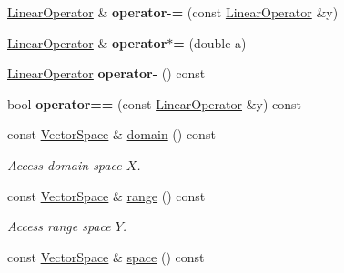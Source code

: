 \begin{DoxyCompactItemize}
\item 
\hypertarget{classSpacy_1_1LinearOperator_a38f6913a360e69a37f32487044958262}{\hyperlink{classSpacy_1_1LinearOperator}{\-Linear\-Operator} \& {\bfseries operator-\/=} (const \hyperlink{classSpacy_1_1LinearOperator}{\-Linear\-Operator} \&y)}\label{classSpacy_1_1LinearOperator_a38f6913a360e69a37f32487044958262}

\item 
\hypertarget{classSpacy_1_1LinearOperator_a1a337571a68b1c5ece14c637682ac8a4}{\hyperlink{classSpacy_1_1LinearOperator}{\-Linear\-Operator} \& {\bfseries operator$\ast$=} (double a)}\label{classSpacy_1_1LinearOperator_a1a337571a68b1c5ece14c637682ac8a4}

\item 
\hypertarget{classSpacy_1_1LinearOperator_ac77bf18c27c54f2589cfd8ccd6e44dd9}{\hyperlink{classSpacy_1_1LinearOperator}{\-Linear\-Operator} {\bfseries operator-\/} () const }\label{classSpacy_1_1LinearOperator_ac77bf18c27c54f2589cfd8ccd6e44dd9}

\item 
\hypertarget{classSpacy_1_1LinearOperator_afbb3e1bce81ac646081f46fc3688313b}{bool {\bfseries operator==} (const \hyperlink{classSpacy_1_1LinearOperator}{\-Linear\-Operator} \&y) const }\label{classSpacy_1_1LinearOperator_afbb3e1bce81ac646081f46fc3688313b}

\item 
\hypertarget{classSpacy_1_1LinearOperator_a1acd2a2f71a95baa2c364b88c4eee126}{const \hyperlink{classSpacy_1_1VectorSpace}{\-Vector\-Space} \& \hyperlink{classSpacy_1_1LinearOperator_a1acd2a2f71a95baa2c364b88c4eee126}{domain} () const }\label{classSpacy_1_1LinearOperator_a1acd2a2f71a95baa2c364b88c4eee126}

\begin{DoxyCompactList}\small\item\em \-Access domain space $X$. \end{DoxyCompactList}\item 
\hypertarget{classSpacy_1_1LinearOperator_a29653883e8ebc3460e9294e3bceee5bf}{const \hyperlink{classSpacy_1_1VectorSpace}{\-Vector\-Space} \& \hyperlink{classSpacy_1_1LinearOperator_a29653883e8ebc3460e9294e3bceee5bf}{range} () const }\label{classSpacy_1_1LinearOperator_a29653883e8ebc3460e9294e3bceee5bf}

\begin{DoxyCompactList}\small\item\em \-Access range space $Y$. \end{DoxyCompactList}\item 
\hypertarget{classSpacy_1_1LinearOperator_ad0116ec957dfb6bc490a4c9702929f8e}{const \hyperlink{classSpacy_1_1VectorSpace}{\-Vector\-Space} \& \hyperlink{classSpacy_1_1LinearOperator_ad0116ec957dfb6bc490a4c9702929f8e}{space} () const }\label{classSpacy_1_1LinearOperator_ad0116ec957dfb6bc490a4c9702929f8e}


\end{DoxyCompactItemize}
